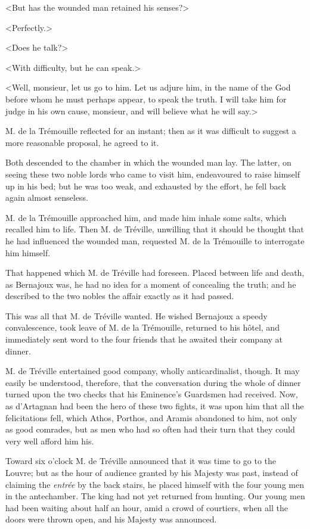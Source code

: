 <But has the wounded man retained his senses?> 

<Perfectly.> 

<Does he talk?> 

<With difficulty, but he can speak.> 

<Well, monsieur, let us go to him. Let us adjure him, in the name of the God before whom he must perhaps appear, to speak the truth. I will take him for judge in his own cause, monsieur, and will believe what he will say.> 

M. de la Trémouille reflected for an instant; then as it was difficult to suggest a more reasonable proposal, he agreed to it. 

Both descended to the chamber in which the wounded man lay. The latter, on seeing these two noble lords who came to visit him, endeavoured to raise himself up in his bed; but he was too weak, and exhausted by the effort, he fell back again almost senseless. 

M. de la Trémouille approached him, and made him inhale some salts, which recalled him to life. Then M. de Tréville, unwilling that it should be thought that he had influenced the wounded man, requested M. de la Trémouille to interrogate him himself. 

That happened which M. de Tréville had foreseen. Placed between life and death, as Bernajoux was, he had no idea for a moment of concealing the truth; and he described to the two nobles the affair exactly as it had passed. 

This was all that M. de Tréville wanted. He wished Bernajoux a speedy convalescence, took leave of M. de la Trémouille, returned to his hôtel, and immediately sent word to the four friends that he awaited their company at dinner. 

M. de Tréville entertained good company, wholly anticardinalist, though. It may easily be understood, therefore, that the conversation during the whole of dinner turned upon the two checks that his Eminence's Guardsmen had received. Now, as d'Artagnan had been the hero of these two fights, it was upon him that all the felicitations fell, which Athos, Porthos, and Aramis abandoned to him, not only as good comrades, but as men who had so often had their turn that they could very well afford him his. 

Toward six o'clock M. de Tréville announced that it was time to go to the Louvre; but as the hour of audience granted by his Majesty was past, instead of claiming the \textit{entrée} by the back stairs, he placed himself with the four young men in the antechamber. The king had not yet returned from hunting. Our young men had been waiting about half an hour, amid a crowd of courtiers, when all the doors were thrown open, and his Majesty was announced. 


